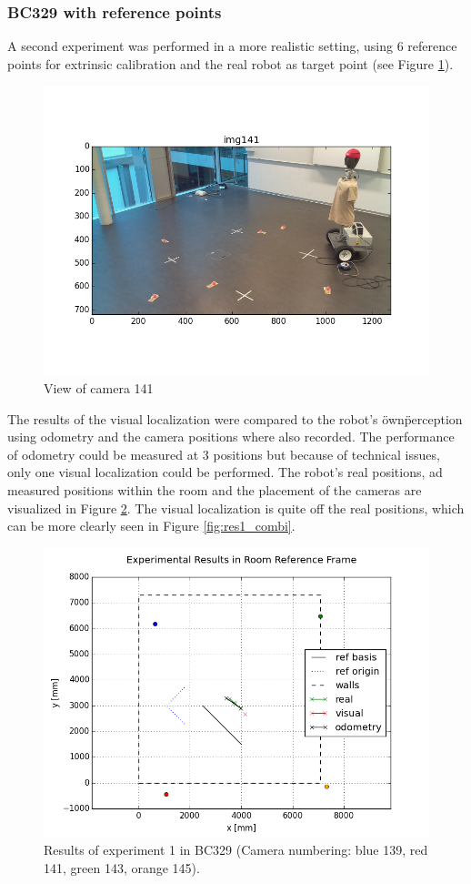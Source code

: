 \subsubsection{BC329 with reference points}

A second experiment was performed in a more realistic setting, using 6 reference points for extrinsic calibration and the real robot as target point (see Figure \ref{fig:res1_img}). 
\begin{figure}[H]
    \centering
    \includegraphics[width=.6\linewidth]{files/res1_img141.png}
    \caption{View of camera 141}
    \label{fig:res1_img}
\end{figure}
The results of the visual localization were compared to the robot's \"own\" perception using odometry and the camera positions where also recorded.
The performance of odometry could be measured at 3 positions but because of technical issues, only one visual localization could be performed. 
The robot's real positions, ad measured positions within the room and the placement of the cameras are visualized in Figure \ref{fig:res1_room}.
The visual localization is quite off the real positions, which can be more clearly seen in Figure \ref{fig:res1_combi}. 

\begin{figure}[H]
    \centering
    \includegraphics[width=.8\linewidth]{files/res1_room.png}
    \caption{Results of experiment 1 in BC329 (Camera numbering: blue 139, red 141, green 143, orange 145).}
    \label{fig:res1_room}
\end{figure}

